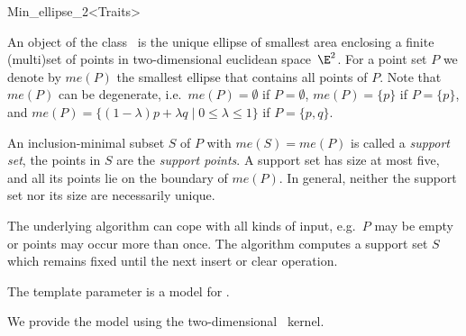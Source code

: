 
\begin{ccRefClass}{Min_ellipse_2<Traits>}


\ccSaveThreeColumns
\cgalMinEllipseLayout

\ccDefinition

An object of the class \ccRefName\ is the unique ellipse of smallest area
enclosing a finite (multi)set of points in two-dimensional euclidean
space~$\E^2$.  For a point set $P$ we denote by $me(P)$ the smallest
ellipse that contains all points of $P$. Note that $me(P)$ can be
degenerate,
i.e.~$me(P)=\emptyset$ if
$P=\emptyset$, $me(P)=\{p\}$ if $P=\{p\}$,
and \mbox{$me(P) = \{ (1-\lambda)p + \lambda q \mid 0 \leq \lambda \leq 1 \}$} if $P=\{p,q\}$.

An inclusion-minimal subset $S$ of $P$ with $me(S)=me(P)$ is called a
\emph{support set},
the points in $S$ are the \emph{support points}.  A support set has size at
most five, and all its points lie on the boundary of $me(P)$. In general,
neither the support set nor its size are necessarily unique.

The underlying algorithm can cope with all kinds of input, e.g.~$P$ may be
empty or points may occur more than once. The algorithm computes a support
set $S$ which remains fixed until the next insert or clear operation.


\ccRequirements
\ccIndexRequirements

The template parameter  is a model for .

We provide the model  using the 
two-dimensional \cgal~kernel.

\ccTypes
\ccIndexClassTypes




\end{ccRefClass}
